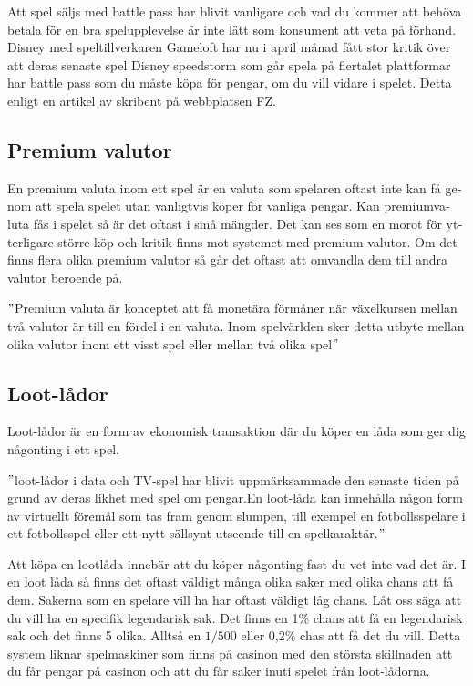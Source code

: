 \documentclass[11p]{article}
\begin{document}
\begin{otherlanguage}{swedish}
    Att spel säljs med battle pass har blivit vanligare och vad du kommer att behöva betala för en bra spelupplevelse är inte lätt som konsument att veta på förhand.
    Disney med speltillverkaren Gameloft har nu i april månad fått stor kritik över att deras senaste spel Disney speedstorm som går spela på flertalet plattformar har battle pass som du måste köpa för pengar, om du vill vidare i spelet.
    Detta enligt en artikel av \textcite{FZ} skribent på webbplatsen FZ.

    \subsection{Premium valutor}
    En premium valuta inom ett spel är en valuta som spelaren oftast inte kan få genom att spela spelet utan vanligtvis köper för vanliga pengar.
    Kan premiumvaluta fås i spelet så är det oftast i små mängder.
    Det kan ses som en morot för ytterligare större köp och kritik finns mot systemet med premium valutor.
    Om det finns flera olika premium valutor så går det oftast att omvandla dem till andra valutor beroende på.

    \setlength{\leftskip}{1cm}

    \("\)Premium valuta är konceptet att få monetära förmåner när växelkursen mellan två valutor är till en fördel i en valuta.
    Inom spelvärlden sker detta utbyte mellan olika valutor inom ett visst spel eller mellan två olika spel\("\)\parencite{bananatic}

    \setlength{\leftskip}{0cm}

    \subsection{Loot-lådor}

    Loot-lådor är en form av ekonomisk transaktion där du köper en låda som ger dig någonting i ett spel.

    \setlength{\leftskip}{1cm}

    \("\)loot-lådor i data och TV-spel har blivit uppmärksammade den senaste tiden på grund av deras likhet med spel om pengar.En loot-låda kan innehålla någon form av virtuellt föremål som tas fram genom slumpen, till exempel en fotbollsspelare i ett fotbollsspel eller ett nytt sällsynt utseende till en spelkaraktär.\("\)\parencite{sverigesradio}

    \setlength{\leftskip}{0cm}

    Att köpa en lootlåda innebär att du köper någonting fast du vet inte vad det är.
    I en loot låda så finns det oftast väldigt många olika saker med olika chans att få dem.
    Sakerna som en spelare vill ha har oftast väldigt låg chans.
    Låt oss säga att du vill ha en specifik legendarisk sak.
    Det finns en 1\% chans att få en legendarisk sak och det finns 5 olika.
    Alltså en \(1/500\) eller 0,2\% chas att få det du vill.
    Detta system liknar spelmaskiner som finns på casinon med den största skillnaden att du får pengar på casinon och att du får saker inuti spelet från loot-lådorna.



\end{otherlanguage}
\end{document}

